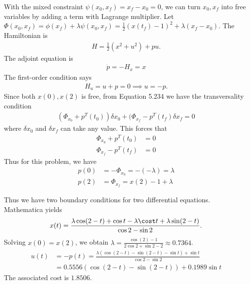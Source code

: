 \documentclass[12pt]{article}
\begin{document}
\begin{problem}[3]
With the mixed constraint $ \psi(x_0,x_f) = x_f - x_0 = 0$, we can turn $ x_0,x_f$ into free variables by adding a term with Lagrange multiplier. Let $ \Phi(x_0,x_f) = \phi(x_f) + \lambda \psi(x_0,x_f)= \frac{1}{2}(x(t_f)-1)^2 + \lambda(x_f - x_0)$. The Hamiltonian is
\begin{align*}
	H = \frac{1}{2} (x^2+u^2)+pu .
\end{align*}
The adjoint equation is
\begin{align*}
	\dot{p}= -H_x = x
\end{align*}
The first-order condition says
\begin{align*}
	H_u = u +p=0 \implies u = -p .
\end{align*}
Since both $x(0), x(2)$ is free, from Equation 5.234 we have the transversality condition
 \begin{align*}
	 (\Phi_{x_0}+p ^{T}(t_0)) \delta x_0 + (\Phi_{x_f}- p ^{T}(t_f)	\delta x_f = 0
\end{align*}
where $ \delta x_0$ and $ \delta x_f$ can take any value. This forces that
\begin{align*}
	\Phi_{x_0} + p ^{T}(t_0) &=0 \\
	\Phi_{x_f} - p ^{T}(t_f) &= 0 
\end{align*}
Thus for this problem, we have
\begin{align*}
	p(0) &= -\Phi_{x_0} = -(- \lambda ) = \lambda\\
	p(2) &= \Phi_{x_f} = x(2) -1 + \lambda  
\end{align*}

Thus we have two boundary conditions for two differential equations. Mathematica yields
\begin{align*}
	x(t) = \frac{\lambda \cos (2-t) + \cos t - \lambda \cost t + \lambda \sin (2-t)}{ \cos 2 - \sin 2 }.
\end{align*}
Solving $ x(0) = x(2)$, we obtain  $ \lambda = \frac{\cos(2)-1}{ 2 \cos 2 + \sin 2-2} \approx 0.7364$.
\begin{align*}
	u(t) &= -p(t) = \frac{\lambda (\cos(2-t)-\sin(2-t)-\sin t)+ \sin t}{\cos 2 - \sin 2 }\\
	&= 0.5556 (\cos(2-t)-\sin(2-t)) + 0.1989 \sin t
\end{align*}
The associated cost is $ 1.8506$.
\end{problem}
\end{document}
